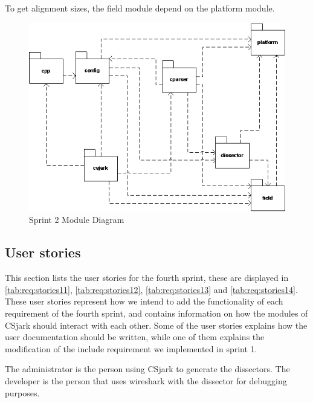 To get alignment sizes, the field module depend on the platform module.

\begin{figure}[ht]
	\center
	\includegraphics[width=\textwidth]{./sprints/img/sp4modulediagram.png}
	\caption{Sprint 2 Module Diagram \label{fig:sp2module}}
\end{figure}

\label{sec:sp4:design:md}

\subsection{User stories}
\label{sec:req:stories4}
This section lists the user stories for the fourth sprint, these are displayed in \autoref{tab:req:stories11}, \autoref{tab:req:stories12}, \autoref{tab:req:stories13} and \autoref{tab:req:stories14}.
These user stories represent how we intend to add the functionality of each requirement of the fourth sprint,
and contains information on how the modules of CSjark should interact with each other.
Some of the user stories explains how the user documentation should be written, while one of them explains the modification of the \gls{include} requirement we implemented in sprint 1.

The administrator is the person using CSjark to generate the \glspl{dissector}. 
The developer is the person that uses \Gls{wireshark} with the \gls{dissector} for debugging purposes.

